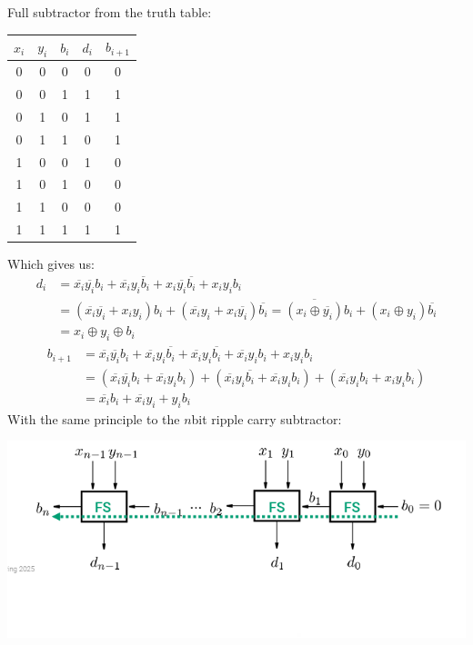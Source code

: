 \begin{parag}{Full subtractor}
    from the truth table:
    \begin{center}
    \begin{tabular}{ccc|cc}
        $x_i$ & $y_i$ & $b_i$ & $d_i$ & $b_{i+1}$ \\
        \hline
        0&0&0&0&0\\
        0&0&1&1&1\\
        0&1&0&1&1\\
        0&1&1&0&1\\
        1&0&0&1&0\\
        1&0&1&0&0\\
        1&1&0&0&0\\
        1&1&1&1&1
    \end{tabular}
    \end{center}
   Which gives us:
   \begin{align*}
       d_i &= \overline{x_i} \overline{y_i} b_i + \overline{x_i}y_i \overline{b}_i + x_i \overline{y_i} \overline{b_i} + x_iy_ib_i\\
           &= ( \overline{x_i} \overline{y_i} + x_iy_i)b_i + ( \overline{x_i}y_i + x_i \overline{y_i}) \overline{b_i} = \overline{(x_i\oplus \overline{y_i})}b_i + (x_i \oplus y_i) \overline{b_i}\\
           &= x_i \oplus y_i \oplus b_i
   \end{align*}
   \begin{align*}
       b_{i+1} &= \overline{x_i} \overline{y_i} b_i + \overline{x_i}y_i \overline{b_i} + \overline{x_i}y_i \overline{b_i} + \overline{x_i}y_ib_i + x_iy_ib_i \\
    &= ( \overline{x_i} \overline{y_i} b_i + \overline{x_i}y_ib_i) + ( \overline{x_i}y_i \overline{b_i} + \overline{x_i}y_ib_i) + ( \overline{x_i}y_ib_i + x_iy_ib_i) \\
    &= \overline{x_i}b_i + \overline{x_i}y_i + y_ib_i
   \end{align*}
   With the same principle to the $n$bit ripple carry subtractor:
\begin{center}
    \includegraphics[scale=0.8]{52025-03-14.png}
\end{center}

   
   
\end{parag}
